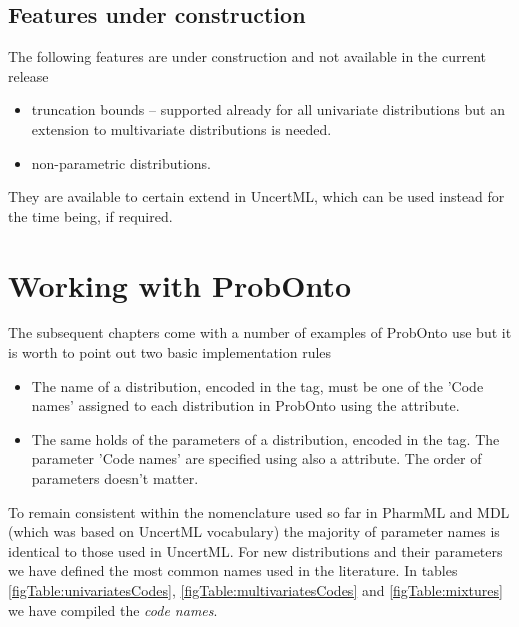 \subsection{Features under construction}
The following features are under construction and not available in the current 
release
\begin{itemize}
\item
truncation bounds -- supported already for all univariate distributions but an extension 
to multivariate distributions is needed.
\item
non-parametric distributions.
\end{itemize}
They are available to certain extend in UncertML, which can be used instead for the time being, if required.


\section{Working with ProbOnto}
\label{sec:workingProbOnto}
The subsequent chapters come with a number of examples of ProbOnto use
but it is worth to point out two basic implementation rules 
\begin{itemize}
\item 
The name of a distribution, encoded in the  tag, 
must be one of the 'Code names' assigned to each distribution in ProbOnto
using the  attribute. 
\item
The same holds of the parameters of a distribution, encoded in the  tag.
The parameter 'Code names' are specified using also a  attribute. 
The order of parameters doesn't matter. 
\end{itemize}
To remain consistent within the nomenclature used so far in PharmML and MDL (which
was based on UncertML vocabulary) the majority of parameter names is identical 
to those used in UncertML. For new distributions and their parameters we have 
defined the most common names used in the literature. 
In tables \ref{figTable:univariatesCodes}, \ref{figTable:multivariatesCodes} 
and \ref{figTable:mixtures} we have compiled the \emph{code names}. 

